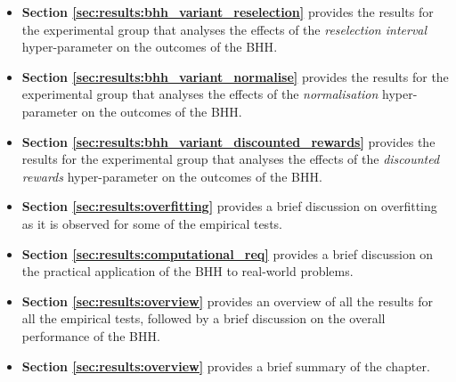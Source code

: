 \begin{itemize}
      \item \textbf{Section \ref{sec:results:bhh_variant_reselection}} provides the results for the experimental group that analyses the effects of the \textit{reselection interval} hyper-parameter on the outcomes of the \acs{BHH}.

      \item \textbf{Section \ref{sec:results:bhh_variant_normalise}} provides the results for the experimental group that analyses the effects of the \textit{normalisation} hyper-parameter on the outcomes of the \acs{BHH}.

      \item \textbf{Section \ref{sec:results:bhh_variant_discounted_rewards}} provides the results for the experimental group that analyses the effects of the \textit{discounted rewards} hyper-parameter on the outcomes of the \acs{BHH}.

      \item \textbf{Section \ref{sec:results:overfitting}} provides a brief discussion on overfitting as it is observed for some of the empirical tests.

      \item \textbf{Section \ref{sec:results:computational_req}} provides a brief discussion on the practical application of the \acs{BHH} to real-world problems.

      \item \textbf{Section \ref{sec:results:overview}} provides an overview of all the results for all the empirical tests, followed by a brief discussion on the overall performance of the \acs{BHH}.

      \item \textbf{Section \ref{sec:results:overview}} provides a brief summary of the chapter.
\end{itemize}
